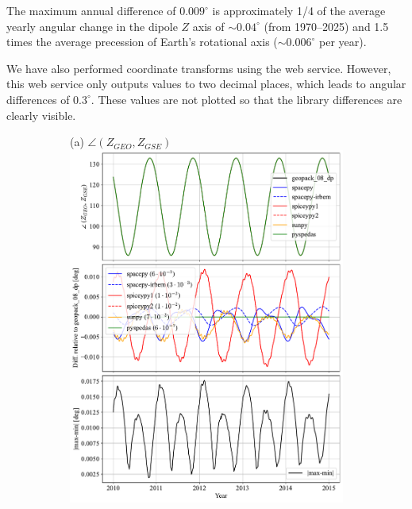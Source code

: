 \documentclass[draft]{agujournal2019}
\begin{document}
The maximum annual difference of $0.009^\circ$ is approximately 1/4 of the average yearly angular change in the dipole $Z$ axis of ${\sim}0.04^\circ$ (from 1970--2025) and 1.5 times the average precession of Earth's rotational axis (${\sim}0.006^\circ$ per year).

We have also performed coordinate transforms using the \cite{SSCWebCoordinateCalculator} web service. However, this web service only outputs values to two decimal places, which leads to angular differences of $0.3^\circ$. These values are not plotted so that the library differences are clearly visible.

\begin{figure}[htb]
     \begin{subfigure}[b]{0.49\textwidth}
         (a) $\angle (Z_{GEO}, Z_{GSE})$
         \centering
         \includegraphics[width=\textwidth]{code/figures/angles/delta=1days_20100101-20150101/GEO_GSE.pdf}
     \end{subfigure}
     \begin{subfigure}[b]{0.49\textwidth}

\end{subfigure}
\end{figure}
\end{document}

